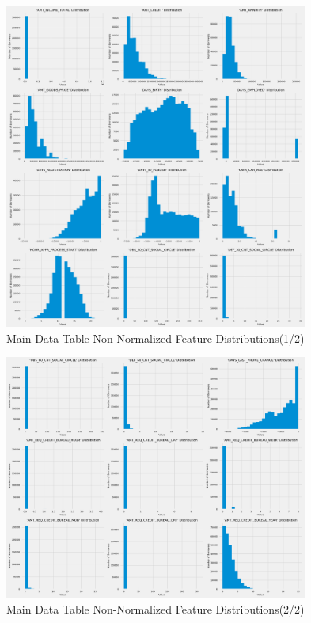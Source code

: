 \documentclass[12pt, letterpaper]{article}
\begin{document}
\begin{appendices}
\begin{figure}[ht]
\includegraphics[width=0.89\textwidth]{main-data-table-non-normal-feature-distribs-p1}
\centering
\caption{Main Data Table Non-Normalized Feature Distributions(1/2)}
\end{figure}

\pagebreak

\begin{figure}[ht]
\includegraphics[width=0.89\textwidth]{main-data-table-non-normal-feature-distribs-p2}
\centering
\caption{Main Data Table Non-Normalized Feature Distributions(2/2)}
\end{figure}

\pagebreak

\end{appendices}

\printbibliography
\end{document}

